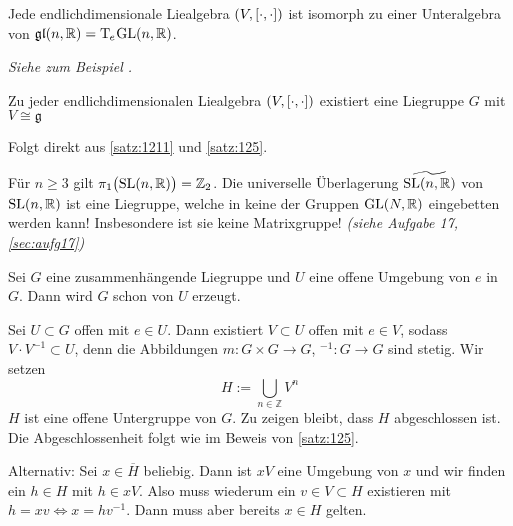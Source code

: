 \begin{satz}[name={Ado},label=satz:1211]
	Jede endlichdimensionale Liealgebra $(V,\benbrace*{\cdot,\cdot})$ ist isomorph zu einer Unteralgebra von $\mathfrak{gl}(n,\mathbb{R}) = \Tmap_e \mkern-2mu\GL(n,\mathbb{R})$.
\end{satz}
\begin{beweis}
	\emph{Siehe zum Beispiel \cite[S. 199]{JacobsonLieAlg}.}
\end{beweis}

\begin{korollar}[{name=[{Zu jeder endlichdimensionalen Liealgebra existiert eine Liegruppe}]}]
	Zu jeder endlichdimensionalen Liealgebra $(V,\benbrace*{\cdot ,\cdot })$ existiert eine Liegruppe $G$ mit $V \cong \mathfrak{g}$
\end{korollar}
\begin{beweis}
	Folgt direkt aus \autoref{satz:1211} und \autoref{satz:125}.
\end{beweis}

\begin{bemerkung*}[{name=[{Existenz von Liegruppen, die keine Matrixgruppe ist}]}]
	Für $n \ge 3$ gilt $\pi_1 \enbrace[\big]{\SL(n,\mathbb{R})} = \mathbb{Z}_2$.
	Die universelle Überlagerung $\widetilde{\SL(n,\mathbb{R})}$ von $\SL(n,\mathbb{R})$ ist eine Liegruppe, welche in keine der Gruppen $\GL(N,\mathbb{R})$ eingebetten werden kann! Insbesondere ist sie keine Matrixgruppe! \emph{(siehe Aufgabe 17, \cref{sec:aufg17})}
\end{bemerkung*}

\begin{lemma}[label=lem:1213,{name=[{Zusammenhängede Liegruppe von Umgebung der Eins erzeugt}]}]
    Sei $G$ eine zusammenhängende Liegruppe und $U$ eine offene Umgebung von $e$ in $G$.
    Dann wird $G$ schon von $U$ erzeugt.
\end{lemma}
\begin{beweis}
    Sei $U \subset G$ offen mit $e \in U$.
    Dann existiert $V \subset U$ offen mit $e \in V$, sodass $V \cdot V^{-1} \subset U$, denn die Abbildungen $m \colon G \times G \to G$, $^{-1} \colon G \to G$ sind stetig.
    Wir setzen 
    \[
        H := \bigcup_{n \in \mathbb{Z}} V^n
    \]
    $H$ ist eine offene Untergruppe von $G$.
    Zu zeigen bleibt, dass $H$ abgeschlossen ist.
    Die Abgeschlossenheit folgt wie im Beweis von \autoref{satz:125}.
	
	Alternativ: Sei $x \in \overline{H}$ beliebig.
	Dann ist $x V$ eine Umgebung von $x$ und wir finden ein $h \in H$ mit $h \in xV$.
	Also muss wiederum ein $v \in V \subset H$ existieren mit $h = xv \iff x = hv^{-1}$. 
	Dann muss aber bereits $x \in H$ gelten.
\end{beweis}

